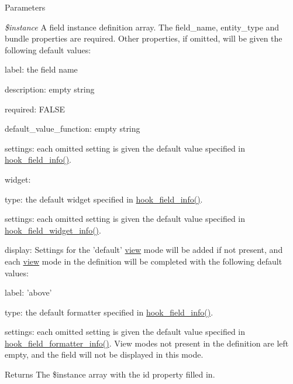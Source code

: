 \begin{DoxyParams}{Parameters}
\item[{\em \$instance}]A field instance definition array. The field\_\-name, entity\_\-type and bundle properties are required. Other properties, if omitted, will be given the following default values:
\begin{DoxyItemize}
\item label: the field name
\item description: empty string
\item required: FALSE
\item default\_\-value\_\-function: empty string
\item settings: each omitted setting is given the default value specified in \hyperlink{group__field__types_gad3eb779f26f41b520f19af011ece3eb1}{hook\_\-field\_\-info()}.
\item widget:
\begin{DoxyItemize}
\item type: the default widget specified in \hyperlink{group__field__types_gad3eb779f26f41b520f19af011ece3eb1}{hook\_\-field\_\-info()}.
\item settings: each omitted setting is given the default value specified in \hyperlink{group__field__widget_gac53aa6c2a4ac1215660d25b5d7f20792}{hook\_\-field\_\-widget\_\-info()}.
\end{DoxyItemize}
\item display: Settings for the 'default' \hyperlink{classview}{view} mode will be added if not present, and each \hyperlink{classview}{view} mode in the definition will be completed with the following default values:
\begin{DoxyItemize}
\item label: 'above'
\item type: the default formatter specified in \hyperlink{group__field__types_gad3eb779f26f41b520f19af011ece3eb1}{hook\_\-field\_\-info()}.
\item settings: each omitted setting is given the default value specified in \hyperlink{group__field__formatter_ga2f5aa1c7455f55dffd84a48efa57f987}{hook\_\-field\_\-formatter\_\-info()}. View modes not present in the definition are left empty, and the field will not be displayed in this mode.
\end{DoxyItemize}
\end{DoxyItemize}\end{DoxyParams}
\begin{DoxyReturn}{Returns}
The \$instance array with the id property filled in.
\end{DoxyReturn}

